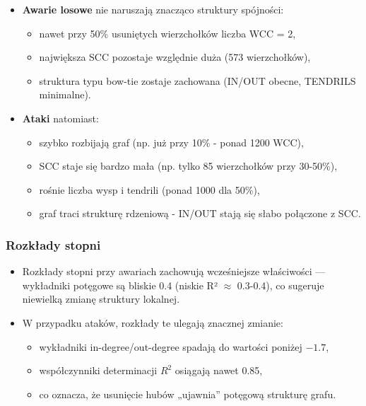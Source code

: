 \begin{itemize}
    \item \textbf{Awarie losowe} nie naruszają znacząco struktury spójności:
    \begin{itemize}
        \item nawet przy 50\% usuniętych wierzchołków liczba WCC = 2,
        \item największa SCC pozostaje względnie duża (573 wierzchołków),
        \item struktura typu bow-tie zostaje zachowana (IN/OUT obecne, TENDRILS minimalne).
    \end{itemize}

    \item \textbf{Ataki} natomiast:
    \begin{itemize}
        \item szybko rozbijają graf (np. już przy 10\% - ponad 1200 WCC),
        \item SCC staje się bardzo mała (np. tylko 85 wierzchołków przy 30-50\%),
        \item rośnie liczba wysp i tendrili (ponad 1000 dla 50\%),
        \item graf traci strukturę rdzeniową - IN/OUT stają się słabo połączone z SCC.
    \end{itemize}
\end{itemize}

\subsubsection{Rozkłady stopni}

\begin{itemize}
    \item Rozkłady stopni przy awariach zachowują wcześniejsze właściwości — wykładniki potęgowe są bliskie 0.4 (niskie R² $\approx$ 0.3-0.4), co sugeruje niewielką zmianę struktury lokalnej.

    \item W przypadku ataków, rozkłady te ulegają znacznej zmianie:
    \begin{itemize}
        \item wykładniki in-degree/out-degree spadają do wartości poniżej $-1.7$,
        \item współczynniki determinacji $R^2$ osiągają nawet 0.85,
        \item co oznacza, że usunięcie hubów „ujawnia” potęgową strukturę grafu.
    \end{itemize}
\end{itemize}

